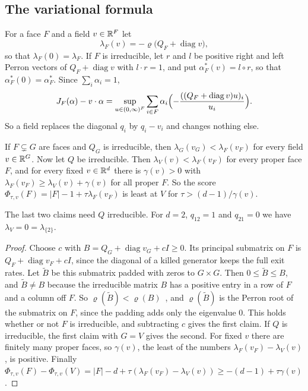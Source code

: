 \subsection{The variational formula}\label{sec:spectral-geometry}

For a face $F$ and a field $v\in\mathbb{R}^F$ let
\begin{equation}\label{eq:lambdaFv}
 \lambda_F(v)=-\varrho\bigl(Q_F+\operatorname{diag}v\bigr),
\end{equation}
so that $\lambda_F(0)=\lambda_F$. If $F$ is irreducible, let $r$ and $l$ be
positive right and left Perron vectors of $Q_F+\operatorname{diag}v$ with
$l\cdot r=1$, and put $\alpha^*_F(v)=l\circ r$, so that $\alpha^*_F(0)=\alpha^*_F$.
Since $\sum_i\alpha_i=1$,
\begin{equation}\label{eq:Jfield}
 J_F(\alpha)-v\cdot\alpha=\sup_{u\in(0,\infty)^F}\sum_{i\in F}\alpha_i
 \Bigl(-\frac{((Q_F+\operatorname{diag}v)u)_i}{u_i}\Bigr).
\end{equation}
So a field replaces the diagonal $q_i$ by $q_i-v_i$ and changes nothing else.

\begin{lemma}\label{lem:face-monotone}
If $F\subsetneq G$ are faces and $Q_G$ is irreducible, then
$\lambda_G(v_G)<\lambda_F(v_F)$ for every field $v\in\mathbb{R}^G$. Now let $Q$ be
irreducible. Then $\lambda_V(v)<\lambda_F(v_F)$ for every proper face $F$, and
for every fixed $v\in\mathbb{R}^d$ there is $\gamma(v)>0$ with
$\lambda_F(v_F)\ge\lambda_V(v)+\gamma(v)$ for all proper $F$. So the score
$\Phi_{\tau,v}(F)=|F|-1+\tau\lambda_F(v_F)$ is least at $V$ for
$\tau>(d-1)/\gamma(v)$.
\end{lemma}

The last two claims need $Q$ irreducible. For $d=2$, $q_{12}=1$ and $q_{21}=0$
we have $\lambda_V=0=\lambda_{\{2\}}$.

\begin{proof}
Choose $c$ with $B=Q_G+\operatorname{diag}v_G+cI\ge0$. Its principal submatrix on
$F$ is $Q_F+\operatorname{diag}v_F+cI$, since the diagonal of a killed generator
keeps the full exit rates. Let $\widetilde B$ be this submatrix padded with zeros
to $G\times G$. Then $0\le\widetilde B\le B$, and $\widetilde B\ne B$ because the
irreducible matrix $B$ has a positive entry in a row of $F$ and a column off $F$.
So $\varrho(\widetilde B)<\varrho(B)$~\cite[Ch.~2]{bermanplemmons1994},
and $\varrho(\widetilde B)$ is the Perron root of the submatrix on $F$, since the
padding adds only the eigenvalue $0$. This holds whether or not $F$ is
irreducible, and subtracting $c$ gives the first claim. If $Q$ is irreducible,
the first claim with $G=V$ gives the second. For fixed $v$ there are
finitely many proper faces, so $\gamma(v)$, the least of the numbers
$\lambda_F(v_F)-\lambda_V(v)$, is positive. Finally
$\Phi_{\tau,v}(F)-\Phi_{\tau,v}(V)=|F|-d+\tau(\lambda_F(v_F)-\lambda_V(v))\ge-(d-1)+\tau\gamma(v)$.
\end{proof}

